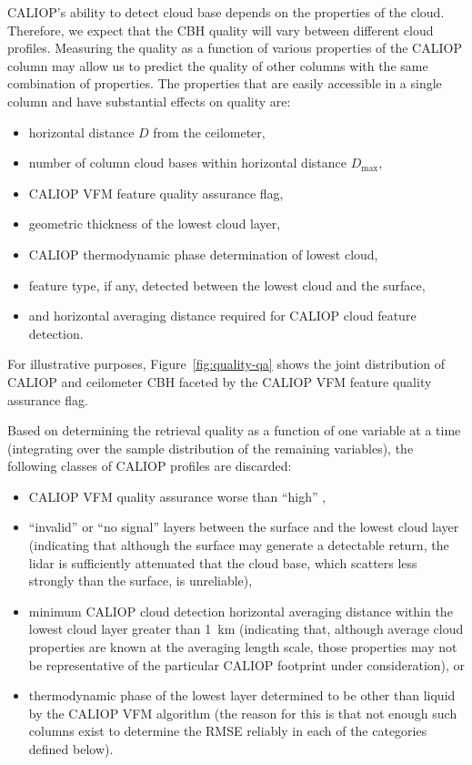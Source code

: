 \documentclass[essd,manuscript]{copernicus}\usepackage[]{graphicx}\usepackage[]{color}
\begin{document}
CALIOP's ability to detect cloud base depends on the properties of the cloud.
Therefore, we expect that the CBH quality will vary between
different cloud profiles.  Measuring the quality as a function of various
properties of the CALIOP column may allow us to predict the quality of other
columns with the same combination of properties.  The properties that are easily
accessible in a single column and have substantial effects on quality are:
\begin{itemize}
\item horizontal distance $D$ from the ceilometer,
\item number of column cloud bases within horizontal distance $D_\text{max}$,
\item CALIOP VFM feature quality assurance flag,
\item geometric thickness of the lowest cloud layer,
\item CALIOP thermodynamic phase determination of lowest cloud,
\item feature type, if any, detected between the lowest cloud and the surface,
\item and horizontal averaging distance required for CALIOP cloud feature
  detection.
\end{itemize}
For illustrative purposes, Figure~\ref{fig:quality-qa} shows the joint
distribution of CALIOP and ceilometer CBH faceted by the CALIOP
VFM feature quality assurance flag.  

Based on determining the retrieval quality as a function of one variable at a
time (integrating over the sample distribution of the remaining variables), the
following classes of CALIOP profiles are discarded:
\begin{itemize}
\item CALIOP VFM quality assurance worse than ``high'' ,
\item ``invalid'' or ``no signal'' layers between the surface and the lowest
  cloud layer (indicating that although the surface may generate a detectable
  return, the lidar is sufficiently attenuated that the cloud base, which
  scatters less strongly than the surface, is unreliable),
\item minimum CALIOP cloud detection horizontal averaging distance within the
  lowest cloud layer greater than 1~km (indicating that, although average cloud
  properties are known at the averaging length scale, those properties may not
  be representative of the particular CALIOP footprint under consideration), or
\item thermodynamic phase of the lowest layer determined to be other than liquid
  by the CALIOP VFM algorithm (the reason for this is that not enough such
  columns exist to determine the RMSE reliably in each of the categories defined
  below).
\end{itemize}
\end{document}
